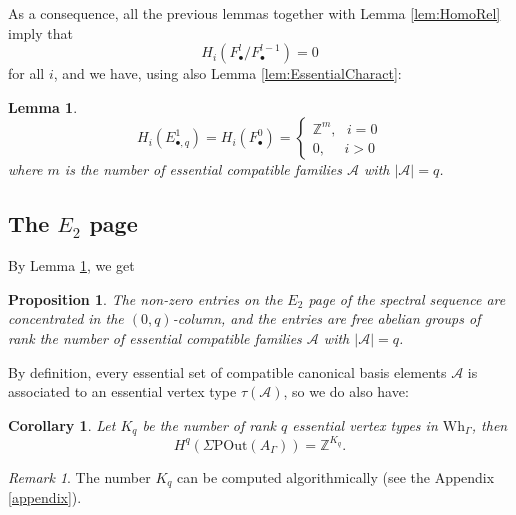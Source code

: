 \documentclass[a4paper]{amsart}
\newcommand{\G}{\Gamma}
\newcommand{\au}{\mathcal{A}}
\newcommand{\POut}{\Sigma\mathrm{POut}}
\newcommand{\Wh}{\mathrm{Wh}}
\newtheorem{prop}[teo]{Proposition}
\newtheorem{cor}[teo]{Corollary}
\newtheorem{lem}[teo]{Lemma}
\theoremstyle{definition}
\theoremstyle{remark}
\newtheorem*{nota}{Remark}
\begin{document}
As a consequence, all the previous lemmas together with Lemma \ref{lem:HomoRel} imply that 
$$
H_i(F_\bullet^l/F^{l-1}_\bullet)=0
$$
for all $i$, and we have, using also Lemma \ref{lem:EssentialCharact}:
\begin{lem}
    $$H_i(E^1_{\bullet,q})=H_i(F^0_\bullet)=\begin{cases}
        \mathbb{Z}^m, \ \ \ i=0 \\
        0, \ \ \ \ \ \ i>0
    \end{cases}
$$
where $m$ is the number of essential compatible families $\au$ with $|\au|=q$. \label{lem:homoE1}
\end{lem}




\subsection{The $E_2$ page}

By Lemma \ref{lem:homoE1}, we get  
\begin{prop}
    The non-zero entries on the $E_2$ page of the spectral sequence 
 are concentrated in the $(0,q)$-column, and the entries are free abelian groups of rank the number of essential compatible  families $\au$ with $|\au|=q$. \label{prop:column}
 \end{prop}


By definition, every essential set of compatible canonical basis elements $\au$ is associated to an essential  vertex type $\tau(\au)$, so we do also have:

\begin{cor}\label{cor:rank}
    Let $K_q$ be the number of rank $q$ essential vertex types in $\Wh_\G$, then
    $$
       H^q(\POut(A_\G))=\mathbb{Z}^{K_q}. 
    $$
\end{cor}
\begin{nota}
    The number $K_q$ can be computed algorithmically (see the Appendix \ref{appendix}).
\end{nota}
\end{document}
